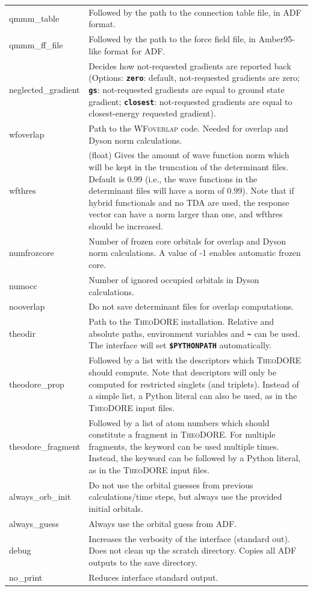 \documentclass[a4paper,10pt,DIV=15,openany]{scrbook}
\newcommand{\ttt}[1]{\textbf{\texttt{#1}}}
\begin{document}
\begin{table}
\begin{tabular}{>{\ttfamily}lp{12cm}}
\\
qmmm\_table             &Followed by the path to the connection table file, in ADF format.
\\
qmmm\_ff\_file          &Followed by the path to the force field file, in Amber95-like format for ADF.
\\
neglected\_gradient     &Decides how not-requested gradients are reported back (Options: \ttt{zero}: default, not-requested gradients are zero; \ttt{gs}: not-requested gradients are equal to ground state gradient; \ttt{closest}: not-requested gradients are equal to closest-energy requested gradient).
\\
wfoverlap               &Path to the \textsc{WFoverlap} code. Needed for overlap and Dyson norm calculations.
\\
wfthres                 &(float) Gives the amount of wave function norm which will be kept in the truncation of the determinant files. Default is 0.99 (i.e., the wave functions in the determinant files will have a norm of 0.99). Note that if hybrid functionals and no TDA are used, the response vector can have a norm larger than one, and wfthres should be increased.
\\
numfrozcore             &Number of frozen core orbitals for overlap and Dyson norm calculations. A value of -1 enables automatic frozen core.
\\
numocc                  &Number of ignored occupied orbitals in Dyson calculations.
\\
nooverlap               &Do not save determinant files for overlap computations.
\\
theodir                 &Path to the \textsc{TheoDORE} installation. Relative and absolute paths, environment variables and \ttt{\textasciitilde} can be used. The interface will set \ttt{\$PYTHONPATH} automatically.
\\
theodore\_prop          &Followed by a list with the descriptors which \textsc{TheoDORE} should compute. Note that descriptors will only be computed for restricted singlets (and triplets). Instead of a simple list, a Python literal can also be used, as in the \textsc{TheoDORE} input files.
\\
theodore\_fragment      &Followed by a list of atom numbers which should constitute a fragment in \textsc{TheoDORE}. For multiple fragments, the keyword can be used multiple times. Instead, the keyword can be followed by a Python literal, as in the \textsc{TheoDORE} input files.
\\
always\_orb\_init       &Do not use the orbital guesses from previous calculations/time steps, but always use the provided initial orbitals.
\\
always\_guess           &Always use the orbital guess from ADF.
\\
  debug                 &Increases the verbosity of the interface (standard out). Does not clean up the scratch directory. Copies all ADF outputs to the save directory.
\\
  no\_print             &Reduces interface standard output.
\\
  \hline
  \end{tabular}
\end{table}
\end{document}
